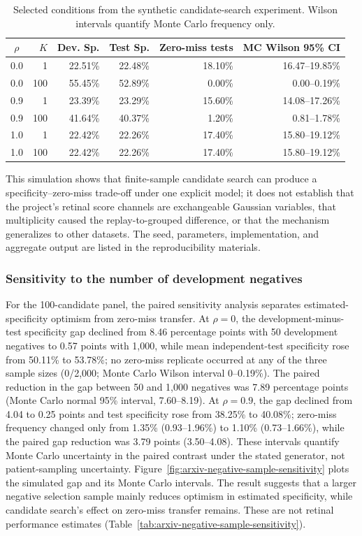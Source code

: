 \documentclass[11pt]{article}
\begin{document}
\begin{table}[t]
\centering
\caption{Selected conditions from the synthetic candidate-search experiment. Wilson intervals quantify Monte Carlo frequency only.}
\label{tab:arxiv-panel-simulation}
\footnotesize
\setlength{\tabcolsep}{3pt}
\begin{tabular}{crrrrr}
\toprule
$\rho$ & $K$ & Dev. Sp. & Test Sp. & Zero-miss tests & MC Wilson 95\% CI \\
\midrule
0.0 & 1 & 22.51\% & 22.48\% & 18.10\% & 16.47--19.85\% \\
0.0 & 100 & 55.45\% & 52.89\% & 0.00\% & 0.00--0.19\% \\
0.9 & 1 & 23.39\% & 23.29\% & 15.60\% & 14.08--17.26\% \\
0.9 & 100 & 41.64\% & 40.37\% & 1.20\% & 0.81--1.78\% \\
1.0 & 1 & 22.42\% & 22.26\% & 17.40\% & 15.80--19.12\% \\
1.0 & 100 & 22.42\% & 22.26\% & 17.40\% & 15.80--19.12\% \\
\bottomrule
\end{tabular}
\end{table}

This simulation shows that finite-sample candidate search can produce a specificity--zero-miss trade-off under one explicit model; it does not establish that the project's retinal score channels are exchangeable Gaussian variables, that multiplicity caused the replay-to-grouped difference, or that the mechanism generalizes to other datasets. The seed, parameters, implementation, and aggregate output are listed in the reproducibility materials.

\subsubsection{Sensitivity to the number of development negatives}
For the 100-candidate panel, the paired sensitivity analysis separates estimated-specificity optimism from zero-miss transfer. At $\rho=0$, the development-minus-test specificity gap declined from 8.46 percentage points with 50 development negatives to 0.57 points with 1,000, while mean independent-test specificity rose from 50.11\% to 53.78\%; no zero-miss replicate occurred at any of the three sample sizes (0/2,000; Monte Carlo Wilson interval 0--0.19\%). The paired reduction in the gap between 50 and 1,000 negatives was 7.89 percentage points (Monte Carlo normal 95\% interval, 7.60--8.19). At $\rho=0.9$, the gap declined from 4.04 to 0.25 points and test specificity rose from 38.25\% to 40.08\%; zero-miss frequency changed only from 1.35\% (0.93--1.96\%) to 1.10\% (0.73--1.66\%), while the paired gap reduction was 3.79 points (3.50--4.08). These intervals quantify Monte Carlo uncertainty in the paired contrast under the stated generator, not patient-sampling uncertainty. Figure~\ref{fig:arxiv-negative-sample-sensitivity} plots the simulated gap and its Monte Carlo intervals. The result suggests that a larger negative selection sample mainly reduces optimism in estimated specificity, while candidate search's effect on zero-miss transfer remains. These are not retinal performance estimates (Table~\ref{tab:arxiv-negative-sample-sensitivity}).
\end{document}
